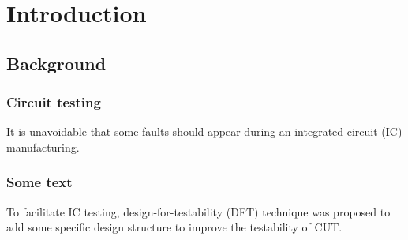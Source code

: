 \chapter{Introduction}
\section{Background}
\subsection{Circuit testing}
It is unavoidable that some faults should appear during an integrated circuit (IC) manufacturing.

\subsection{Some text}

To facilitate IC testing, design-for-testability (DFT) technique was proposed to add some specific design structure to improve the testability of CUT\cite{hithesis2017,cnarticle}. 